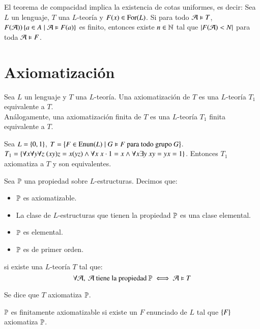 \begin{obs}
    El teorema de compacidad implica la existencia de cotas uniformes, es decir:
    Sea $L$ un lenguaje, $T$ una $L$-teoría y $F(x) \in \for(L)$. Si para todo $\mtc A \vDash T$, $F(\mtc A) ) \sdf{ a \in A \mid \mtc A \vDash F(a)}$ es finito, entonces existe $n \in \N$ tal que $\vabs{F(\mtc A) < N}$ para toda $\mtc A \vDash F$.
\end{obs}

\section{Axiomatización}

\begin{dfn}[Axiomatización]
    Sea $L$ un lenguaje y $T$ una $L$-teoría. Una axiomatización de $T$ es una $L$-teoría $T_1$ equivalente a $T$.\\
    Análogamente, una axiomatización finita de $T$ es una $L$-teoría $T_1$ finita equivalente a $T$.
\end{dfn}

\begin{eg}
    Sea $L = \sdf{0, 1}$, $T = \sdf{F \in\mathrm{Enun}(L) \mid G \vDash F \text{ para todo grupo $G$}}$.\\
    $T_1 = \sdf{\forall x\forall y \forall z\ (xy)z = x(yz) \land \forall x\ x\cdot 1 = x \land \forall x \exists y\ xy = yx = 1}$. Entonces $T_1$ axiomatiza a $T$ y son equivalentes.
\end{eg}

\begin{dfn}
    Sea $\P$  una propiedad sobre $L$-estructuras. Decimos que:
    \begin{itemize}
        \item $\P$ es axiomatizable.
        \item La clase de $L$-estructuras que tienen la propiedad $\P$ es una clase elemental.
        \item $\P$ es elemental.
        \item $\P$ es de primer orden.
    \end{itemize}
    si existe una $L$-teoría $T$ tal que:
    $$
        \forall \mtc A,\ \mtc A \text{ tiene la propiedad } \P \iff \mtc A \vDash T
    $$
\end{dfn}
\begin{obs}[Notación]
    Se dice que $T$ axiomatiza $\P$.
\end{obs}

\begin{dfn}
    $\P$ es finitamente axiomatizable si existe un $F$ enunciado de $L$ tal que $\sdf{F}$ axiomatiza $\P$.
\end{dfn}
